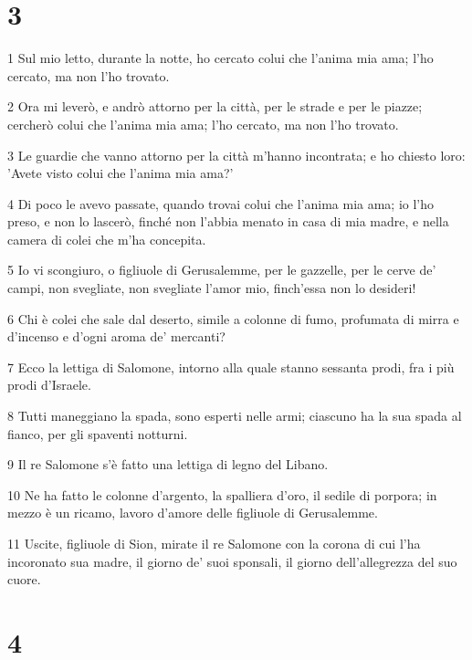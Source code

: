 \chapter{3}

\par 1 Sul mio letto, durante la notte, ho cercato colui che l'anima mia ama; l'ho cercato, ma non l'ho trovato.
\par 2 Ora mi leverò, e andrò attorno per la città, per le strade e per le piazze; cercherò colui che l'anima mia ama; l'ho cercato, ma non l'ho trovato.
\par 3 Le guardie che vanno attorno per la città m'hanno incontrata; e ho chiesto loro: 'Avete visto colui che l'anima mia ama?'
\par 4 Di poco le avevo passate, quando trovai colui che l'anima mia ama; io l'ho preso, e non lo lascerò, finché non l'abbia menato in casa di mia madre, e nella camera di colei che m'ha concepita.
\par 5 Io vi scongiuro, o figliuole di Gerusalemme, per le gazzelle, per le cerve de' campi, non svegliate, non svegliate l'amor mio, finch'essa non lo desideri!
\par 6 Chi è colei che sale dal deserto, simile a colonne di fumo, profumata di mirra e d'incenso e d'ogni aroma de' mercanti?
\par 7 Ecco la lettiga di Salomone, intorno alla quale stanno sessanta prodi, fra i più prodi d'Israele.
\par 8 Tutti maneggiano la spada, sono esperti nelle armi; ciascuno ha la sua spada al fianco, per gli spaventi notturni.
\par 9 Il re Salomone s'è fatto una lettiga di legno del Libano.
\par 10 Ne ha fatto le colonne d'argento, la spalliera d'oro, il sedile di porpora; in mezzo è un ricamo, lavoro d'amore delle figliuole di Gerusalemme.
\par 11 Uscite, figliuole di Sion, mirate il re Salomone con la corona di cui l'ha incoronato sua madre, il giorno de' suoi sponsali, il giorno dell'allegrezza del suo cuore.

\chapter{4}

